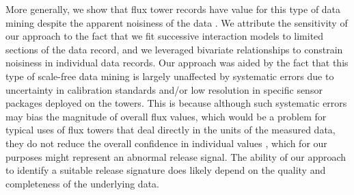 \documentclass{article}
\begin{document}
More generally, we show that flux tower records have value for this type of data mining despite the apparent noisiness of the data \citep{fratiniEddyCovarianceFlux2018}. We attribute the sensitivity of our approach to the fact that we fit successive interaction models to limited sections of the data record, and we leveraged bivariate relationships to constrain noisiness in individual data records. Our approach was aided by the fact that this type of scale-free data mining is largely unaffected by systematic errors due to uncertainty in calibration standards and/or low resolution in specific sensor packages deployed on the towers. This is because although such systematic errors may bias the magnitude of overall flux values, which would be a problem for typical uses of flux towers that deal directly in the units of the measured data, they do not reduce the overall confidence in individual values \citep{langfordEddycovarianceDataLow2015}, which for our purposes might represent an abnormal release signal. The ability of our approach to identify a suitable release signature does likely depend on the quality and completeness of the underlying data.
\end{document}
